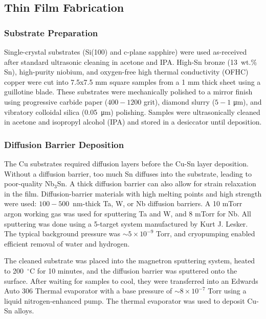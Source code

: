     \subsection{Thin Film Fabrication}
    
    \subsubsection{Substrate Preparation}

    
    Single-crystal substrates (Si(100) and c-plane sapphire) were used as-received after standard ultrasonic cleaning in acetone and IPA. High-Sn bronze (13~wt.\% Sn), high-purity niobium, and oxygen-free high thermal conductivity (OFHC) copper were cut into 7.5x7.5 mm square samples from a 1 mm thick sheet using a guillotine blade. These substrates were mechanically polished to a mirror finish using progressive carbide paper ($400-1200$ grit), diamond slurry ($5-1$ \unit{\um}), and vibratory colloidal silica (0.05~\unit{\um}) polishing. Samples were ultrasonically cleaned in acetone and isopropyl alcohol (IPA) and stored in a desiccator until deposition.
    
    \subsubsection{Diffusion Barrier Deposition}
    
    The Cu substrates required diffusion layers before the Cu-Sn layer deposition. Without a diffusion barrier, too much Sn diffuses into the substrate, leading to poor-quality Nb$_3$Sn. A thick diffusion barrier can also allow for strain relaxation in the film. Diffusion-barrier materials with high melting points and high strength were used: $100 - 500$~nm-thick Ta, W, or Nb diffusion barriers. A 10 mTorr argon working gas was used for sputtering Ta and W, and 8 mTorr for Nb. All sputtering was done using a 5-target system manufactured by Kurt J. Lesker. The typical background pressure was $\sim 5 \times 10^{-9}$ Torr, and cryopumping enabled efficient removal of water and hydrogen. 
    
    The cleaned substrate was placed into the magnetron sputtering system, heated to 200~$^{\circ}$C for 10 minutes, and the diffusion barrier was sputtered onto the surface. After waiting for samples to cool, they were transferred into an Edwards Auto 306 Thermal evaporator with a base pressure of $\sim8 \times10^{-7}$ Torr using a liquid nitrogen-enhanced pump. The thermal evaporator was used to deposit Cu-Sn alloys. 
    
